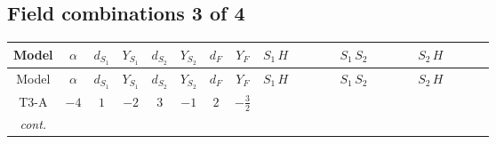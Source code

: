 \documentclass[8pt]{article}
\begin{document}
\begin{landscape}
\subsection*{Field combinations 3 of 4}
\begin{longtable}{@{}cccccccc >{\raggedright\arraybackslash}p{0.21\linewidth} >{\raggedright\arraybackslash}p{0.21\linewidth} >{\raggedright\arraybackslash}p{0.21\linewidth}@{}}
\toprule
Model & $\alpha$ & $d_{S_1}$ & $Y_{S_1}$ & $d_{S_2}$ & $Y_{S_2}$ & $d_F$ & $Y_F$ & $S_1\,H$ & $S_1\,S_2$ & $S_2\,H$ \\
\midrule
\endfirsthead
\toprule
Model & $\alpha$ & $d_{S_1}$ & $Y_{S_1}$ & $d_{S_2}$ & $Y_{S_2}$ & $d_F$ & $Y_F$ & $S_1\,H$ & $S_1\,S_2$ & $S_2\,H$ \\
\midrule
\endhead
T3-A & $-4$ & $1$ & $-2$ & $3$ & $-1$ & $2$ & $-\frac{3}{2}$ & \scriptsize\adjustbox{max width=\linewidth}{$\begin{gathered} +H_{a_2} S_1 H_{a_1}{}^{\dagger } S_1{}^{\dagger } \mathcal{I}_{H1,a_1,a_2}{}^1 \lambda_{HS_1}^{(1)}^{(1)}\end{gathered}$} & \scriptsize\adjustbox{max width=\linewidth}{$\begin{gathered} +S_1 S_{2,j_2} S_1{}^{\dagger } S_{2,j_1}{}^{\dagger } \mathcal{I}_{12,j_1,j_2}{}^1 \lambda_{12}^{(1)}^{(1)}\end{gathered}$} & \scriptsize\adjustbox{max width=\linewidth}{$\begin{gathered} +\frac{1}{2} H_{a_2} S_{2,j_2} H_{a_1}{}^{\dagger } S_{2,j_1}{}^{\dagger } \mathcal{I}_{H2,a_1,a_2,j_1,j_2}{}^1 \lambda_{HS_2}^{(1)}^{(1)} \\ +\frac{1}{2} H_{a_2} S_{2,j_2} H_{a_1}{}^{\dagger } S_{2,j_1}{}^{\dagger } \mathcal{I}_{H2,a_1,a_2,j_2,j_1}{}^1 \lambda_{HS_2}^{(1)}^{(1)} \\ +\frac{1}{2} H_{a_2} S_{2,j_2} H_{a_1}{}^{\dagger } S_{2,j_1}{}^{\dagger } \mathcal{I}_{H2,a_1,a_2,j_1,j_2}{}^2 \lambda_{HS_2}^{(1)}^{(2)}\end{gathered}$} \\
\textit{cont.} &  &  &  &  &  &  &  &  &  & \scriptsize\adjustbox{max width=\linewidth}{$\begin{gathered} +\frac{1}{2} H_{a_2} S_{2,j_2} H_{a_1}{}^{\dagger } S_{2,j_1}{}^{\dagger } \mathcal{I}_{H2,a_1,a_2,j_2,j_1}{}^2 \lambda_{HS_2}^{(1)}^{(2)}\end{gathered}$} \\
\midrule
\bottomrule
\end{longtable}
\clearpage

\end{landscape}
\end{document}
